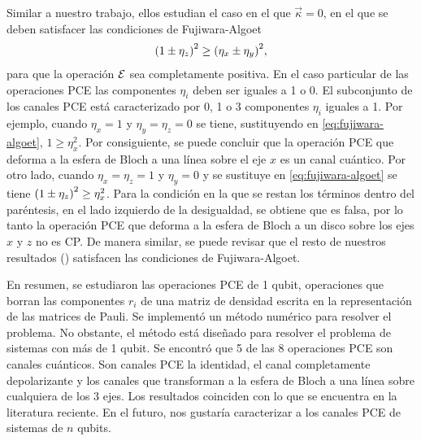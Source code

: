 Similar a nuestro trabajo, ellos estudian el caso en el que 
$\vec{\kappa}=0$, en el que se deben satisfacer 
las condiciones de Fujiwara-Algoet
\begin{align}
\qty(1\pm\eta_z)^2\geq\qty(\eta_x\pm\eta_y)^2,
\label{eq:fujiwara-algoet}
\end{align}
para que la operación $\mathcal{E}$ sea completamente positiva. En el 
caso particular de las operaciones PCE las 
componentes $\eta_i$ deben ser iguales a 1 o 0. 
El subconjunto de los canales PCE está caracterizado por
0, 1 o 3 componentes $\eta_i$ iguales a 1. Por ejemplo, 
cuando $\eta_x=1$ y $\eta_y=\eta_z=0$ se tiene,
sustituyendo en \eqref{eq:fujiwara-algoet}, $1\geq\eta_x^2$. 
Por consiguiente, se puede concluir que
la operación PCE que deforma  a la esfera de 
Bloch a una línea sobre el eje $x$ es un canal cuántico. Por otro lado, 
cuando $\eta_x=\eta_z=1$ y $\eta_y=0$ y se sustituye 
en \eqref{eq:fujiwara-algoet} se tiene $\qty(1\pm\eta_z)^2\geq\eta_x^2$. 
Para la condición en la que se restan los términos dentro 
del paréntesis, en el lado izquierdo de la desigualdad, se obtiene que
es falsa, por lo tanto la operación PCE que deforma a la esfera de 
Bloch a un disco sobre los ejes $x$ y $z$ no es CP. De manera
similar, se puede revisar que el resto de nuestros
resultados () satisfacen las condiciones
de Fujiwara-Algoet.

En resumen, se estudiaron las operaciones PCE de 1 qubit, operaciones 
que borran las componentes $r_i$ de una matriz de densidad 
escrita en la representación de las matrices de Pauli. 
Se implementó un método numérico para resolver
el problema. No obstante, el método está diseñado  
para resolver el problema de sistemas con más de 1 qubit.
Se encontró que 5 de las 8 operaciones PCE son canales cuánticos.
Son canales PCE la identidad, el canal completamente depolarizante 
y los canales que transforman a la esfera de Bloch a una línea sobre 
cualquiera de los 3 ejes. Los resultados coinciden con lo que se
encuentra en la literatura reciente. En el futuro, nos gustaría 
caracterizar a los canales PCE de sistemas de $n$ qubits.



